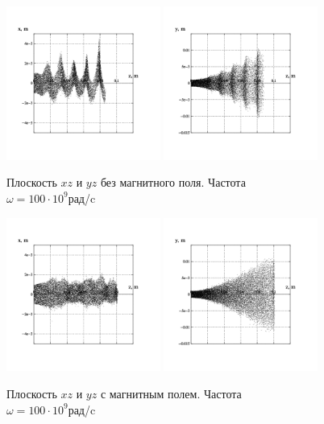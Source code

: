 \documentclass[a4paper,14pt]{extreport} %
\begin{document}
\clearpage
\begin{figure}[c]
	\parbox{0.48\textwidth}{
		\includegraphics[width = 0.45\textwidth]{images/png/without_mf/100xz.png}
		\includegraphics[width = 0.45\textwidth]{images/png/without_mf/100yz.png}
		\caption{Плоскость $xz$ и $yz$ без магнитного поля. Частота \\
			$\omega = 100\cdot10^9$рад/c}
	}
	\quad
	\parbox{0.48\textwidth}{
		\includegraphics[width = 0.45\textwidth]{images/png/withmf/100xz.png}
		\includegraphics[width = 0.45\textwidth]{images/png/withmf/100yz.png}
		\caption{Плоскость $xz$ и $yz$ с магнитным полем. Частота \\
			$\omega = 100\cdot10^9$рад/c}
	}
\end{figure}
\end{document}
